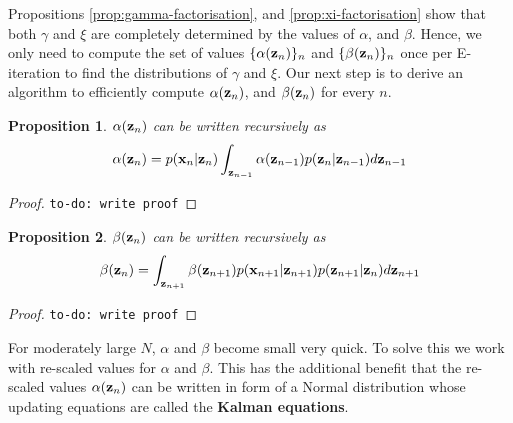 \documentclass[11pt]{article}
\newtheorem{proposition}{Proposition}[section]
\begin{document}
Propositions \ref{prop:gamma-factorisation}, and \ref{prop:xi-factorisation} show that both $\gamma$ and $\xi$ are completely determined by the values of $\alpha$, and $\beta$. Hence, we only need to compute the set of values $\{\alpha({\bf z}_n)\}_n$ and $\{\beta({\bf z}_n)\}_n$ once per E-iteration to find the distributions of $\gamma$ and $\xi$. Our next step is to derive an algorithm to efficiently compute $\alpha({\bf z}_n)$, and $\beta({\bf z}_n)$ for every $n$.

\begin{proposition}
	$\alpha({\bf z}_n)$ can be written recursively as
	\begin{equation}
		\alpha({\bf z}_n) = p({\bf x}_n\vert {\bf z}_n) \int_{{\bf z}_{n-1}} \alpha({\bf z}_{n-1})p({\bf z}_n\vert{\bf z}_{n-1}) d{\bf z}_{n-1}
	\end{equation}
\end{proposition}

\begin{proof}
	\texttt{to-do: write proof}
\end{proof}

\begin{proposition}
	$\beta({\bf z}_n)$ can be written recursively as
	\begin{equation}
		\beta({\bf z}_n) = \int_{{\bf z}_{n+1}} \beta({\bf z}_{n+1})p({\bf x}_{n+1}\vert {\bf z}_{n+1}) p({\bf z}_{n+1}\vert {\bf z}_n) d{\bf z}_{n+1}
	\end{equation} 
\end{proposition}

\begin{proof}
	\texttt{to-do: write proof}
\end{proof}

For moderately large $N$, $\alpha$ and $\beta$ become small very quick. To solve this we work with re-scaled values for $\alpha$ and $\beta$. This has the additional benefit that the re-scaled values $\alpha({\bf z}_n)$ can be written in form of a Normal distribution whose updating equations are  called the \textbf{Kalman equations}.

\end{document}
